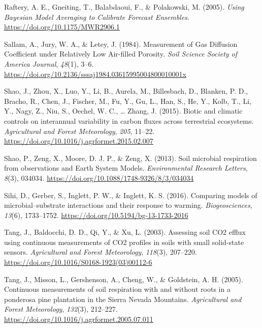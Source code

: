 \documentclass[
  letterpaper,
  DIV=11,
  numbers=noendperiod]{scrartcl}
\newlength{\cslhangindent}
\newenvironment{CSLReferences}[2] %
 {\begin{list}{}{%
  \setlength{\itemindent}{0pt}
  \setlength{\leftmargin}{0pt}
  \setlength{\parsep}{0pt}
  \ifodd #1
   \setlength{\leftmargin}{\cslhangindent}
   \setlength{\itemindent}{-1\cslhangindent}
  \fi
  \setlength{\itemsep}{#2\baselineskip}}}
 {\end{list}}
\begin{document}
\begin{CSLReferences}{1}{0}
Raftery, A. E., Gneiting, T., Balabdaoui, F., \& Polakowski, M. (2005).
\emph{Using {Bayesian Model Averaging} to {Calibrate Forecast
Ensembles}}. \url{https://doi.org/10.1175/MWR2906.1}

Sallam, A., Jury, W. A., \& Letey, J. (1984). Measurement of {Gas
Diffusion Coefficient} under {Relatively Low Air}-filled {Porosity}.
\emph{Soil Science Society of America Journal}, \emph{48}(1), 3--6.
\url{https://doi.org/10.2136/sssaj1984.03615995004800010001x}

Shao, J., Zhou, X., Luo, Y., Li, B., Aurela, M., Billesbach, D.,
Blanken, P. D., Bracho, R., Chen, J., Fischer, M., Fu, Y., Gu, L., Han,
S., He, Y., Kolb, T., Li, Y., Nagy, Z., Niu, S., Oechel, W. C., \ldots{}
Zhang, J. (2015). Biotic and climatic controls on interannual
variability in carbon fluxes across terrestrial ecosystems.
\emph{Agricultural and Forest Meteorology}, \emph{205}, 11--22.
\url{https://doi.org/10.1016/j.agrformet.2015.02.007}

Shao, P., Zeng, X., Moore, D. J. P., \& Zeng, X. (2013). Soil microbial
respiration from observations and {Earth System Models}.
\emph{Environmental Research Letters}, \emph{8}(3), 034034.
\url{https://doi.org/10.1088/1748-9326/8/3/034034}

Sihi, D., Gerber, S., Inglett, P. W., \& Inglett, K. S. (2016).
Comparing models of microbial--substrate interactions and their response
to warming. \emph{Biogeosciences}, \emph{13}(6), 1733--1752.
\url{https://doi.org/10.5194/bg-13-1733-2016}

Tang, J., Baldocchi, D. D., Qi, Y., \& Xu, L. (2003). Assessing soil
{CO2} efflux using continuous measurements of {CO2} profiles in soils
with small solid-state sensors. \emph{Agricultural and Forest
Meteorology}, \emph{118}(3), 207--220.
\url{https://doi.org/10.1016/S0168-1923(03)00112-6}

Tang, J., Misson, L., Gershenson, A., Cheng, W., \& Goldstein, A. H.
(2005). Continuous measurements of soil respiration with and without
roots in a ponderosa pine plantation in the {Sierra Nevada Mountains}.
\emph{Agricultural and Forest Meteorology}, \emph{132}(3), 212--227.
\url{https://doi.org/10.1016/j.agrformet.2005.07.011}


\end{CSLReferences}
\end{document}
